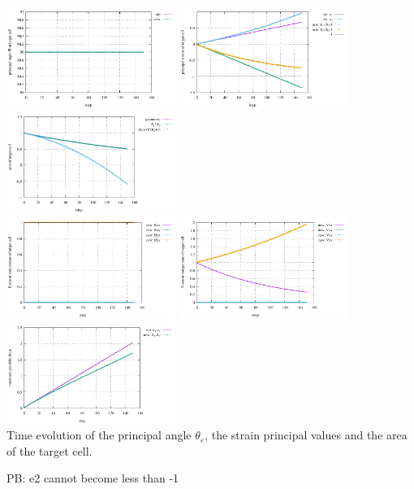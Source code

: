 \begin{center}
\includegraphics[width=5.5cm]{python_codes/fieldstone_89/results/biaxial/principal_angle.pdf}
\includegraphics[width=5.5cm]{python_codes/fieldstone_89/results/biaxial/principal_strains.pdf}
\includegraphics[width=5.5cm]{python_codes/fieldstone_89/results/biaxial/area.pdf}\\
\includegraphics[width=5.5cm]{python_codes/fieldstone_89/results/biaxial/R.pdf}
\includegraphics[width=5.5cm]{python_codes/fieldstone_89/results/biaxial/V.pdf}
\includegraphics[width=5.5cm]{python_codes/fieldstone_89/results/biaxial/maximum_shear.pdf}\\
{\captionfont Time evolution of the principal angle $\theta_\varepsilon$, 
the strain principal values and the area of the target cell.}
\end{center}

PB: e2 cannot become less than -1 















